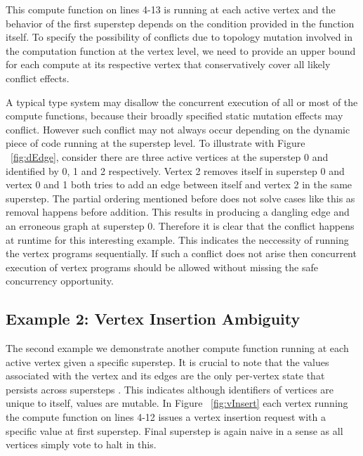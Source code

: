 This compute function on lines 4-13 is running at each active vertex and the behavior of the first superstep depends on the condition provided in the function itself. To specify the possibility of conflicts due to topology mutation involved in the computation function at the vertex level, we need to provide an upper bound for each compute at its respective vertex that conservatively cover all likely conflict effects.

A typical type system may disallow the concurrent execution of all or most of the compute functions, because their broadly specified static mutation effects may conflict. However such conflict may not always occur depending on the dynamic piece of code running at the superstep level. To illustrate with Figure ~\ref{fig:dEdge}, consider there are three active vertices at the superstep 0 and identified by 0, 1 and 2 respectively. Vertex 2 removes itself in superstep 0 and vertex 0 and 1 both tries to add an edge between itself and vertex 2 in the same superstep. The partial ordering mentioned before does not solve cases like this as removal happens before addition. This results in producing a dangling edge and an erroneous graph at superstep 0. Therefore it is clear that the conflict happens at runtime for this interesting example. This indicates the neccessity of running the vertex programs sequentially. If such a conflict does not arise then concurrent execution of vertex programs should be allowed without missing the safe concurrency opportunity. 



\subsection{Example 2: Vertex Insertion Ambiguity}
\label{subsec:example2}

The second example we demonstrate another compute function running at each active vertex given a specific superstep. It is crucial to note that the values associated with the vertex and its edges are the only per-vertex state that persists across supersteps \cite{Pregel2010}. This indicates although identifiers of vertices are unique to itself, values are mutable. In Figure ~\ref{fig:vInsert} each vertex running the compute function on lines 4-12 issues a vertex insertion request with a specific value at first superstep. Final superstep is again naive in a sense as all vertices simply vote to halt in this.


